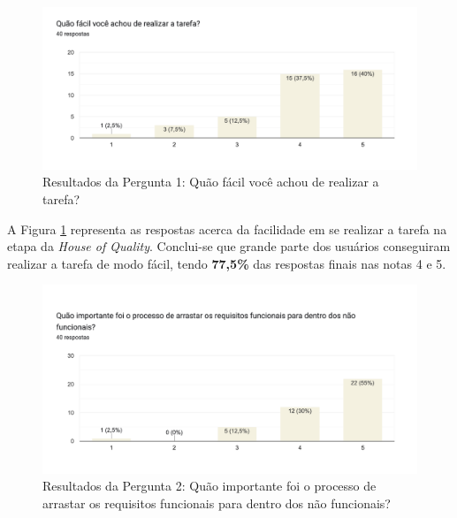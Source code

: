 \begin{figure}[]
  \begin{center}
      \caption{{Resultados da Pergunta 1: Quão fácil você achou de realizar a tarefa?}}
      \label{fig:hq_respostas_1}
      \includegraphics[scale=0.65]{figuras/questionario/resultados-hq-1.png}
  \end{center}
\end{figure}

A Figura \ref{fig:hq_respostas_1} representa as respostas acerca da facilidade em se realizar a tarefa na etapa da \textit{House of Quality}. Conclui-se que grande parte dos usuários conseguiram realizar a tarefa de modo fácil, tendo \textbf{77,5\%} das respostas finais nas notas 4 e 5.

\begin{figure}[]
  \begin{center}
      \caption{{Resultados da Pergunta 2: Quão importante foi o processo de arrastar os requisitos funcionais para dentro dos não funcionais?}}
      \label{fig:hq_respostas_2}
      \includegraphics[scale=0.65]{figuras/questionario/resultados-hq-2.png}
  \end{center}
\end{figure}

